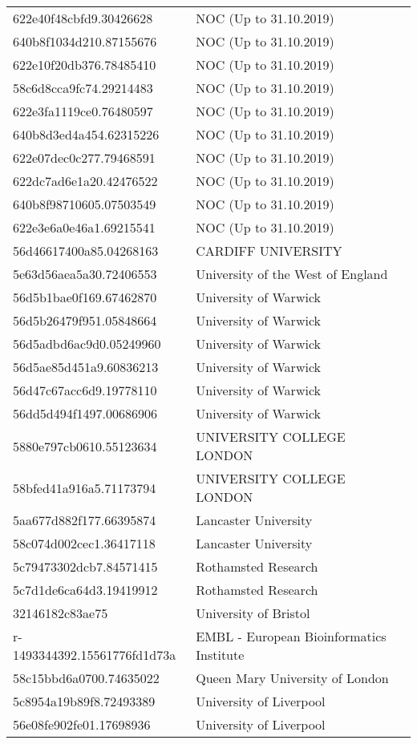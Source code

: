 \begin{tabular}{ll}
622e40f48cbfd9.30426628 & NOC (Up to 31.10.2019) \\
640b8f1034d210.87155676 & NOC (Up to 31.10.2019) \\
622e10f20db376.78485410 & NOC (Up to 31.10.2019) \\
58c6d8cca9fc74.29214483 & NOC (Up to 31.10.2019) \\
622e3fa1119ce0.76480597 & NOC (Up to 31.10.2019) \\
640b8d3ed4a454.62315226 & NOC (Up to 31.10.2019) \\
622e07dec0c277.79468591 & NOC (Up to 31.10.2019) \\
622dc7ad6e1a20.42476522 & NOC (Up to 31.10.2019) \\
640b8f98710605.07503549 & NOC (Up to 31.10.2019) \\
622e3e6a0e46a1.69215541 & NOC (Up to 31.10.2019) \\
56d46617400a85.04268163 & CARDIFF UNIVERSITY \\
5e63d56aea5a30.72406553 & University of the West of England \\
56d5b1bae0f169.67462870 & University of Warwick \\
56d5b26479f951.05848664 & University of Warwick \\
56d5adbd6ac9d0.05249960 & University of Warwick \\
56d5ae85d451a9.60836213 & University of Warwick \\
56d47c67acc6d9.19778110 & University of Warwick \\
56dd5d494f1497.00686906 & University of Warwick \\
5880e797cb0610.55123634 & UNIVERSITY COLLEGE LONDON \\
58bfed41a916a5.71173794 & UNIVERSITY COLLEGE LONDON \\
5aa677d882f177.66395874 & Lancaster University \\
58c074d002cec1.36417118 & Lancaster University \\
5c79473302dcb7.84571415 & Rothamsted Research \\
5c7d1de6ca64d3.19419912 & Rothamsted Research \\
32146182c83ae75 & University of Bristol \\
r-1493344392.15561776fd1d73a & EMBL - European Bioinformatics Institute \\
58c15bbd6a0700.74635022 & Queen Mary University of London \\
5c8954a19b89f8.72493389 & University of Liverpool \\
56e08fe902fe01.17698936 & University of Liverpool \\

\end{tabular}
